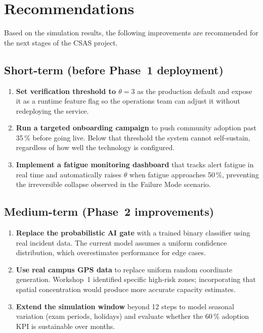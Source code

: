 \documentclass[conference,a4paper,10pt]{IEEEtran}
\begin{document}
\section{Recommendations}

Based on the simulation results, the following improvements are
recommended for the next stages of the CSAS project.

\subsection{Short-term (before Phase~1 deployment)}

\begin{enumerate}
  \item \textbf{Set verification threshold to $\theta = 3$} as the
    production default and expose it as a runtime feature flag so
    the operations team can adjust it without redeploying the service.
  \item \textbf{Run a targeted onboarding campaign} to push community
    adoption past 35\,\% before going live. Below that threshold the
    system cannot self-sustain, regardless of how well the technology
    is configured.
  \item \textbf{Implement a fatigue monitoring dashboard} that tracks
    alert fatigue in real time and automatically raises $\theta$ when
    fatigue approaches 50\,\%, preventing the irreversible collapse
    observed in the Failure Mode scenario.
\end{enumerate}

\subsection{Medium-term (Phase~2 improvements)}

\begin{enumerate}
  \item \textbf{Replace the probabilistic AI gate} with a trained
    binary classifier using real incident data. The current model
    assumes a uniform confidence distribution, which overestimates
    performance for edge cases.
  \item \textbf{Use real campus GPS data} to replace uniform random
    coordinate generation. Workshop~1 identified specific high-risk
    zones; incorporating that spatial concentration would produce
    more accurate capacity estimates.
  \item \textbf{Extend the simulation window} beyond 12 steps to
    model seasonal variation (exam periods, holidays) and evaluate
    whether the 60\,\% adoption KPI is sustainable over months.
\end{enumerate}
\end{document}
